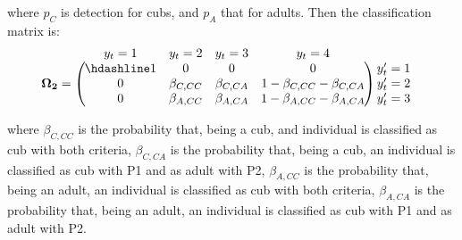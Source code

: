 \documentclass[
  12pt,
]{krantz}
\begin{document}
where \(p_C\) is detection for cubs, and \(p_A\) that for adults. Then the classification matrix is:
\[\begin{matrix}
& \\
\mathbf{\Omega_2} =
    \left ( \vphantom{ \begin{matrix} 12 \\ 12 \\ 12\end{matrix} } \right .
\end{matrix}
\hspace{-1.2em}
\begin{matrix}
    y_t=1 & y_t=2 & y_t=3 & y_t=4\\ \hdashline
1 & 0 & 0 & 0\\
0 & \beta_{C,CC} & \beta_{C,CA} & 1 - \beta_{C,CC} - \beta_{C,CA}\\
0 & \beta_{A,CC} & \beta_{A,CA} & 1 - \beta_{A,CC} - \beta_{A,CA}\\
\end{matrix}
\hspace{-0.2em}
\begin{matrix}
& \\
\left . \vphantom{ \begin{matrix} 12 \\ 12 \\ 12\end{matrix} } \right )
    \begin{matrix}
    y'_{t}=1 \\ y'_{t}=2 \\ y'_{t}=3
    \end{matrix}
\end{matrix}\]

where \(\beta_{C,CC}\) is the probability that, being a cub, and individual is classified as cub with both criteria, \(\beta_{C,CA}\) is the probability that, being a cub, an individual is classified as cub with P1 and as adult with P2, \(\beta_{A,CC}\) is the probability that, being an adult, an individual is classified as cub with both criteria, \(\beta_{A,CA}\) is the probability that, being an adult, an individual is classified as cub with P1 and as adult with P2.
\end{document}
